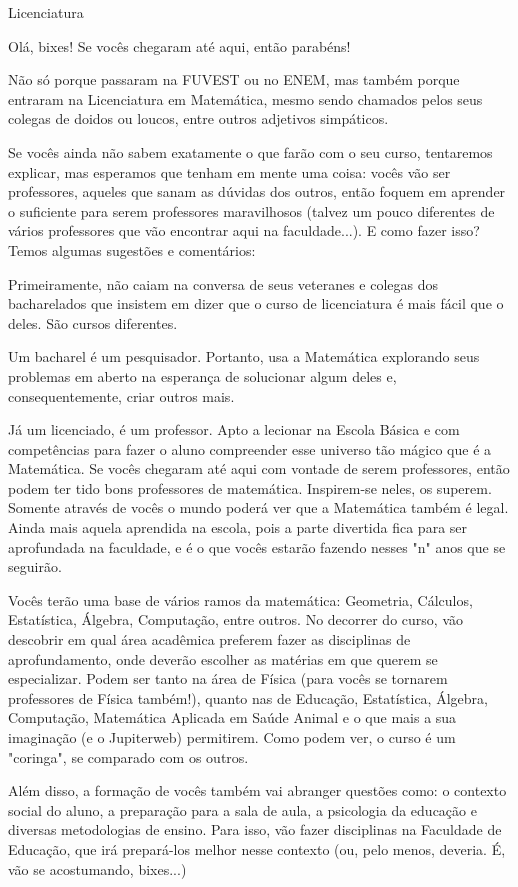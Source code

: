\begin{subsecao}{Licenciatura}

Olá, bixes! Se vocês chegaram até aqui, então parabéns!

Não só porque passaram na FUVEST ou no ENEM, mas também porque entraram na
Licenciatura em Matemática, mesmo sendo chamados pelos seus colegas de doidos ou
loucos, entre outros adjetivos simpáticos.

Se vocês ainda não sabem exatamente o que farão com o seu curso, tentaremos
explicar, mas esperamos que tenham em mente uma coisa: vocês vão ser
professores, aqueles que sanam as dúvidas dos outros, então foquem em
aprender o suficiente para serem professores maravilhosos (talvez um pouco diferentes
de vários professores que vão encontrar aqui na faculdade...). E como fazer isso? 
Temos algumas sugestões e comentários:

Primeiramente, não caiam na conversa de seus veteranes e colegas dos bacharelados
que insistem em dizer que o curso de licenciatura é mais fácil que o deles. São
cursos diferentes.

Um bacharel é um pesquisador. Portanto, usa a Matemática explorando seus
problemas em aberto na esperança de solucionar algum deles e, consequentemente,
criar outros mais.

Já um licenciado, é um professor. Apto a lecionar na Escola Básica e com
competências para fazer o aluno compreender esse universo tão mágico que é a
Matemática. Se vocês chegaram até aqui com vontade de serem professores, então
podem ter tido bons professores de matemática. Inspirem-se neles, os
superem. Somente através de vocês o mundo poderá ver que a Matemática também é legal. 
Ainda mais aquela aprendida na escola, pois a parte divertida fica para ser 
aprofundada na faculdade, e é o que vocês estarão fazendo nesses "n" anos que se seguirão.

Vocês terão uma base de vários ramos da matemática: Geometria, Cálculos,
Estatística, Álgebra, Computação, entre outros. No decorrer do curso, vão
descobrir em qual área acadêmica preferem fazer as disciplinas de
aprofundamento, onde deverão escolher as matérias em que querem se especializar.
Podem ser tanto na área de Física (para vocês se tornarem professores de Física
também!), quanto nas de Educação, Estatística, Álgebra, Computação, Matemática
Aplicada em Saúde Animal e o que mais a sua imaginação (e o Jupiterweb) permitirem.
Como podem ver, o curso é um "coringa", se comparado com os outros.

Além disso, a formação de vocês também vai abranger questões como: o contexto
social do aluno, a preparação para a sala de aula, a psicologia da educação e
diversas metodologias de ensino. Para isso, vão fazer disciplinas na
Faculdade de Educação, que irá prepará-los melhor nesse contexto (ou, pelo
menos, deveria. É, vão se acostumando, bixes...)


\end{subsecao}
